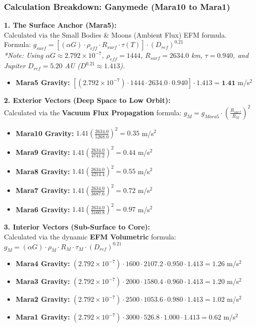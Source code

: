 \documentclass[11pt, a4paper]{article}
\begin{document}
\clearpage
\subsubsection{Calculation Breakdown: Ganymede (Mara10 to Mara1)}

\noindent \textbf{1. The Surface Anchor (Mara5):} \\
Calculated via the Small Bodies \& Moons (Ambient Flux) EFM formula. \\
Formula: $g_{surf} = \left[ (\alpha G) \cdot \rho_{eff} \cdot R_{surf} \cdot \tau(T) \right] \cdot (D_{ref})^{0.21}$ \\
\textit{*Note: Using $\alpha G \approx 2.792 \times 10^{-7}$, $\rho_{eff} = 1444$, $R_{surf} = 2634.0$ km, $\tau = 0.940$, and Jupiter $D_{ref} = 5.20$ AU ($D^{0.21} \approx 1.413$).}
\begin{itemize}
  \item \textbf{Mara5 Gravity:} $\left[ (2.792 \times 10^{-7}) \cdot 1444 \cdot 2634.0 \cdot 0.940 \right] \cdot 1.413 = \textbf{1.41}$ m/s$^2$
\end{itemize}

\vspace{0.5em}
\noindent \textbf{2. Exterior Vectors (Deep Space to Low Orbit):} \\
Calculated via the \textbf{Vacuum Flux Propagation} formula: $g_M = g_{Mara5} \cdot \left( \frac{R_{surf}}{R_M} \right)^2$
\begin{itemize}
  \item \textbf{Mara10 Gravity:} $1.41 \left( \frac{2634.0}{5268.0} \right)^2 = 0.35$ m/s$^2$
  \item \textbf{Mara9 Gravity:} $1.41 \left( \frac{2634.0}{4741.2} \right)^2 = 0.44$ m/s$^2$
  \item \textbf{Mara8 Gravity:} $1.41 \left( \frac{2634.0}{4214.4} \right)^2 = 0.55$ m/s$^2$
  \item \textbf{Mara7 Gravity:} $1.41 \left( \frac{2634.0}{3687.6} \right)^2 = 0.72$ m/s$^2$
  \item \textbf{Mara6 Gravity:} $1.41 \left( \frac{2634.0}{3160.8} \right)^2 = 0.97$ m/s$^2$
\end{itemize}

\vspace{0.5em}
\noindent \textbf{3. Interior Vectors (Sub-Surface to Core):} \\
Calculated via the dynamic \textbf{EFM Volumetric} formula: $g_M = (\alpha G) \cdot \rho_{M} \cdot R_M \cdot \tau_M \cdot (D_{ref})^{0.21}$
\begin{itemize}
  \item \textbf{Mara4 Gravity:} $(2.792 \times 10^{-7}) \cdot 1600 \cdot 2107.2 \cdot 0.950 \cdot 1.413 = 1.26$ m/s$^2$
  \item \textbf{Mara3 Gravity:} $(2.792 \times 10^{-7}) \cdot 2000 \cdot 1580.4 \cdot 0.960 \cdot 1.413 = 1.20$ m/s$^2$
  \item \textbf{Mara2 Gravity:} $(2.792 \times 10^{-7}) \cdot 2500 \cdot 1053.6 \cdot 0.980 \cdot 1.413 = 1.02$ m/s$^2$
  \item \textbf{Mara1 Gravity:} $(2.792 \times 10^{-7}) \cdot 3000 \cdot 526.8 \cdot 1.000 \cdot 1.413 = 0.62$ m/s$^2$
\end{itemize}
\end{document}
